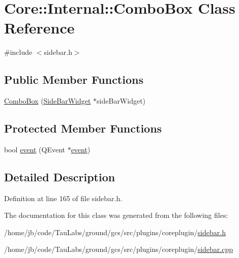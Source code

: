 \hypertarget{class_core_1_1_internal_1_1_combo_box}{\section{\-Core\-:\-:\-Internal\-:\-:\-Combo\-Box \-Class \-Reference}
\label{class_core_1_1_internal_1_1_combo_box}
}


{\ttfamily \#include $<$sidebar.\-h$>$}

\subsection*{\-Public \-Member \-Functions}
\begin{DoxyCompactItemize}
\item 
\hyperlink{group___core_plugin_gaa41267baec16385b8d7659ec5aadbedb}{\-Combo\-Box} (\hyperlink{class_core_1_1_internal_1_1_side_bar_widget}{\-Side\-Bar\-Widget} $\ast$side\-Bar\-Widget)
\end{DoxyCompactItemize}
\subsection*{\-Protected \-Member \-Functions}
\begin{DoxyCompactItemize}
\item 
bool \hyperlink{group___core_plugin_ga01c032ab5193ddd6ab96894f35f7acb8}{event} (\-Q\-Event $\ast$\hyperlink{group___core_plugin_ga01c032ab5193ddd6ab96894f35f7acb8}{event})
\end{DoxyCompactItemize}


\subsection{\-Detailed \-Description}


\-Definition at line 165 of file sidebar.\-h.



\-The documentation for this class was generated from the following files\-:\begin{DoxyCompactItemize}
\item 
/home/jb/code/\-Tau\-Labs/ground/gcs/src/plugins/coreplugin/\hyperlink{sidebar_8h}{sidebar.\-h}\item 
/home/jb/code/\-Tau\-Labs/ground/gcs/src/plugins/coreplugin/\hyperlink{sidebar_8cpp}{sidebar.\-cpp}\end{DoxyCompactItemize}
